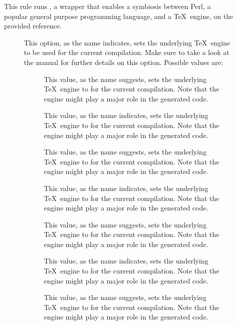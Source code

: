 \begin{description}
\item[]
This rule runs , a wrapper that enables a symbiosis between Perl, a popular general purpose programming language, and a \TeX\ engine, on the provided  reference.

\begin{description}
\item[] This option, as the name indicates, sets the underlying \TeX\ engine to be used for the current compilation. Make sure to take a look at the manual for further details on this option. Possible values are:

\begin{description}
\item[] This value, as the name suggests, sets the underlying \TeX\ engine to  for the current compilation. Note that the engine might play a major role in the generated code.

\item[] This value, as the name indicates, sets the underlying \TeX\ engine to  for the current compilation. Note that the engine might play a major role in the generated code.

\item[] This value, as the name suggests, sets the underlying \TeX\ engine to  for the current compilation. Note that the engine might play a major role in the generated code.

\item[] This value, as the name indicates, sets the underlying \TeX\ engine to  for the current compilation. Note that the engine might play a major role in the generated code.

\item[] This value, as the name suggests, sets the underlying \TeX\ engine to  for the current compilation. Note that the engine might play a major role in the generated code.

\item[] This value, as the name indicates, sets the underlying \TeX\ engine to  for the current compilation. Note that the engine might play a major role in the generated code.

\item[] This value, as the name suggests, sets the underlying \TeX\ engine to  for the current compilation. Note that the engine might play a major role in the generated code.


\end{description}
\end{description}
\end{description}
